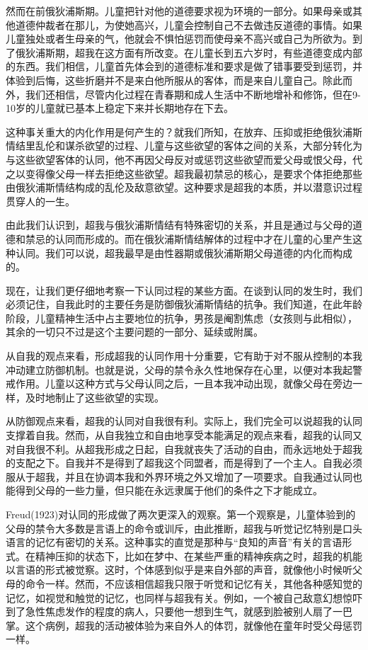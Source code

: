 \documentclass[UTF8,10pt,a4paper,openany]{book}
\begin{document}
然而在前俄狄浦斯期。儿童把针对他的道德要求视为环境的一部分。如果母亲或其他道德仲裁者在那儿，为使她高兴，儿童会控制自己不去做违反道德的事情。如果儿童独处或者生母亲的气，他就会不惧怕惩罚而使母亲不高兴或自己为所欲为。到了俄狄浦斯期，超我在这方面有所改变。在儿童长到五六岁时，有些道德变成内部的东西。我们相信，儿童首先体会到的道德标准和要求是做了错事要受到惩罚，并体验到后悔，这些折磨并不是来白他所服从的客体，而是来自儿童自己。除此而外，我们还相信，尽管内化过程在青春期和成人生活中不断地增补和修饰，但在9-10岁的儿童就已基本上稳定下来并长期地存在下去。

这种事关重大的内化作用是何产生的？就我们所知，在放弃、压抑或拒绝俄狄浦斯情结里乱伦和谋杀欲望的过程、儿童与这些欲望的客体之间的关系，大部分转化为与这些欲望客体的认同，他不再因父母反对或惩罚这些欲望而爱父母或恨父母，代之以变得像父母一样去拒绝这些欲望。超我最初禁忌的核心，是要求个体拒绝那些由俄狄浦斯情结构成的乱伦及敌意欲望。这种要求是超我的本质，并以潜意识过程贯穿人的一生。

由此我们认识到，超我与俄狄浦斯情结有特殊密切的关系，并且是通过与父母的道德和禁忌的认同而形成的。而在俄狄浦斯情结解体的过程中才在儿童的心里产生这种认同。我们可以说，超我最早是由性器期或俄狄浦斯期父母道德的内化而构成的。

现在，让我们更仔细地考察一下认同过程的某些方面。在谈到认同的发生时，我们必须记住，自我此时的主要任务是防御俄狄浦斯情结的抗争。我们知道，在此年龄阶段，儿童精神生活中占主要地位的抗争，男孩是阉割焦虑（女孩则与此相似），其余的一切只不过是这个主要问题的一部分、延续或附属。

从自我的观点来看，形成超我的认同作用十分重要，它有助于对不服从控制的本我冲动建立防御机制。也就是说，父母的禁令永久性地保存在心里，以便对本我起警戒作用。儿童以这种方式与父母认同之后，一且本我冲动出现，就像父母在旁边一样，及时地制止了这些欲望的实现。

从防御观点来看，超我的认同对自我很有利。实际上，我们完全可以说超我的认同支撑着自我。然而，从自我独立和自由地享受本能满足的观点来看，超我的认同又对自我很不利。从超我形成之日起，自我就丧失了活动的自由，而永远地处于超我的支配之下。自我并不是得到了超我这个同盟者，而是得到了一个主人。自我必须服从于超我，并且在协调本我和外界环境之外又增加了一项要求。自我通过认同也能得到父母的一些力量，但只能在永远隶属于他们的条件之下才能成立。

Freud(1923)对认同的形成做了两次更深入的观察。第一个观察是，儿童体验到的父母的禁令大多数是言语上的命令或训斥，由此推断，超我与听觉记忆特别是口头语言的记忆有密切的关系。这种事实的直觉是那种与“良知的声音”有关的言语形式。在精神压抑的状态下，比如在梦中、在某些严重的精神疾病之时，超我的机能以言语的形式被觉察。这时，个体感到似乎是来自外部的声音，就像他小时候听父母的命令一样。然而，不应该相信超我只限于听觉和记忆有关，其他各种感知觉的记忆，如视觉和触觉的记忆，也同样与超我有关。例如，一个被自己敌意幻想惊吓到了急性焦虑发作的程度的病人，只要他一想到生气，就感到脸被别人扇了一巴掌。这个病例，超我的活动被体验为来自外人的体罚，就像他在童年时受父母惩罚一样。
\end{document}
